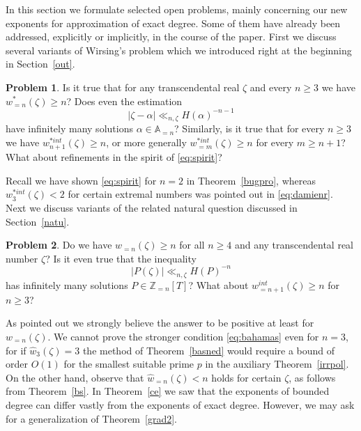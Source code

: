 \documentclass[12pt]{amsart}
\theoremstyle{definition}
\newtheorem{problem}{Problem}
\begin{document}
In this section we formulate selected open problems, mainly concerning our new exponents 
for approximation of exact degree.
Some of them have already been addressed, explicitly or implicitly, in the course of the paper.
First we discuss several variants of Wirsing's problem 
which we introduced right at the beginning in Section~\ref{out}.

\begin{problem} \label{pr1}
Is it true that for any transcendental real $\zeta$ and every $n\geq 3$ we have $w_{=n}^{\ast}(\zeta)\geq n$?
Does even the estimation
%
\begin{equation} \label{eq:spirit}
\vert \zeta-\alpha\vert \ll_{n,\zeta} H(\alpha)^{-n-1}
\end{equation}
% 
have infinitely many solutions $\alpha\in \mathbb{A}_{=n}$?
Similarly, is it true that for every $n\geq 3$ we have $w_{n+1}^{\ast int}(\zeta)\geq n$, or more generally
 $w_{=m}^{\ast int}(\zeta)\geq n$ for every $m\geq n+1$?
What about refinements in the spirit of \eqref{eq:spirit}?
\end{problem}  

Recall we have shown \eqref{eq:spirit} for $n=2$ in Theorem~\ref{bugpro}, whereas
$w_{3}^{\ast int}(\zeta)<2$ for certain extremal numbers was pointed out in \eqref{eq:damienr}. Next we discuss variants of the 
related natural question discussed in Section~\ref{natu}.

\begin{problem} \label{pro2}
Do we have $w_{=n}(\zeta)\geq n$ for all $n\geq 4$ and any transcendental real number $\zeta$?
Is it even true that the inequality
%
\begin{equation} \label{eq:bahamas}
\vert P(\zeta)\vert \ll_{n,\zeta} H(P)^{-n}
\end{equation}
%
has infinitely many solutions $P\in \mathbb{Z}_{=n}[T]$?
What about $w_{=n+1}^{int}(\zeta)\geq n$ for $n\geq 3$?
\end{problem}


As pointed out we strongly believe the answer to be positive
at least for $w_{=n}(\zeta)$. We cannot prove the stronger
condition \eqref{eq:bahamas} even for $n=3$, for
if $\widehat{w}_{3}(\zeta)=3$ the method of Theorem~\ref{basned} 
would require a bound of order $O(1)$ for the smallest suitable 
prime $p$ in the auxiliary Theorem~\ref{irrpol}.
On the other hand, observe that 
$\widehat{w}_{=n}(\zeta)<n$ holds for certain $\zeta$, 
as follows from Theorem~\ref{bs}.
In Theorem~\ref{ce} we saw that the exponents of bounded degree
can differ vastly from the exponents of exact degree.
However, we may ask for a generalization of Theorem~\ref{grad2}.
\end{document}
